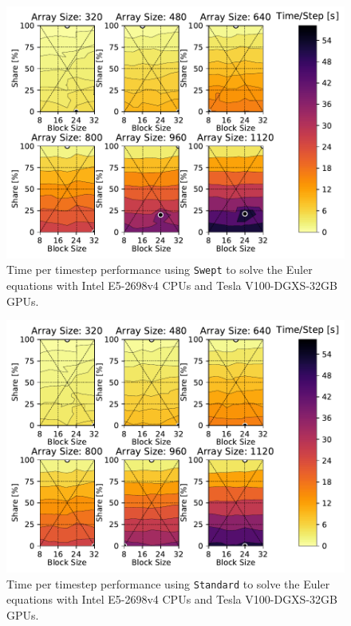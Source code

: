\documentclass[mca,article,submit,moreauthors,pdftex]{Definitions/mdpi}
\def\Swept{\texttt{Swept}}
\def\Standard{\texttt{Standard}}
\def\newCPU{Intel E5-2698v4} %
\def\newGPU{Tesla V100-DGXS-32GB}
\begin{document}
\begin{figure}[htbp]
    \widefigure
    \includegraphics[scale=0.85]{figs/timePerStepSwepteulerNew.pdf}
    \caption{Time per timestep performance using \Swept{} to solve the Euler equations with \newCPU{} CPUs and \newGPU{} GPUs.}
    \label{fig:tptNewEulerSwept} 
\end{figure}

\begin{figure}[htbp]
    \widefigure
    \includegraphics[scale=0.85]{figs/timePerStepStandardeulerNew.pdf}
    \caption{Time per timestep performance using \Standard{}{} to solve the Euler equations with \newCPU{} CPUs and \newGPU{} GPUs.}
    \label{fig:tptNewEulerStandard} 
\end{figure}
\end{document}
